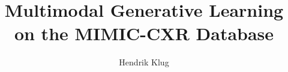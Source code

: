 \documentclass[english]{article}
\title{Multimodal Generative Learning on the MIMIC-CXR Database}
\author{Hendrik Klug}
\date{}
\begin{document}
\maketitle
\noindent








\clearpage

\end{document}
